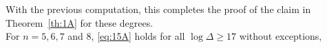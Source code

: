 \documentclass[a4paper,11pt]{amsart}
\theoremstyle{remark}
\begin{document}
%
%
%
With the previous computation, this completes the proof of the claim in Theorem~\ref{th:1A} for these
degrees. %
\smallskip\\
%
%
For $n= 5,6,7$ and $8$, \eqref{eq:15A} holds for all $\log \Delta \geq 17$ without exceptions,
%
%
%
\end{document}
